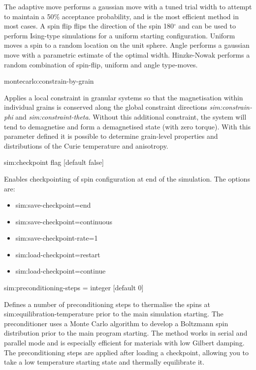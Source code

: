 The adaptive move performs a gaussian move with a tuned trial width to attempt
to maintain a 50\% acceptance probability, and is the most efficient method in
most cases. A spin flip flips the direction of the spin 180$^{\circ}$ and can be
used to perform Ising-type simulations for a uniform starting configuration.
Uniform moves a spin to a random location on the unit sphere. Angle performs a
gaussian move with a parametric estimate of the optimal width. Hinzke-Nowak
performs a random combination of spin-flip, uniform and angle type-moves.

{\zicf montecarlo:constrain-by-grain}
Applies a local constraint in granular systems so that the magnetisation within
individual grains is conserved along the global constraint directions
\textit{sim:constrain-phi} and \textit{sim:constraint-theta}. Without this
additional constraint, the system will tend to demagnetise and form a
demagnetised state (with zero torque). With this parameter defined it is
possible to determine grain-level properties and distributions of the Curie
temperature and anisotropy.

{\zicf sim:checkpoint flag [default false]} Enables checkpointing of spin configuration at end of the simulation. The options are:

\begin{itemize}
  \item[] sim:save-checkpoint=end
  \item[] sim:save-checkpoint=continuous
  \item[] sim:save-checkpoint-rate=1
  \item[] sim:load-checkpoint=restart
  \item[] sim:load-checkpoint=continue
\end{itemize}

{\zicf sim:preconditioning-steps = integer [default 0]} Defines a number of preconditioning steps to thermalise the spins at sim:equilibration-temperature prior to the main simulation starting. The preconditioner uses a Monte Carlo algorithm to develop a Boltzmann spin distribution prior to the main program starting. The method works in serial and parallel mode and is especially efficient for materials with low Gilbert damping. The preconditioning steps are applied after loading a checkpoint, allowing you to take a low temperature starting state and thermally equilibrate it.

